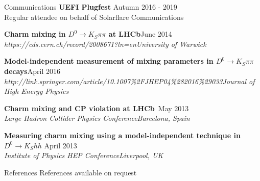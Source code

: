 \documentclass{format/resume} %
\begin{document}

\begin{rSection}{Communications}
  {\bf UEFI Plugfest} \hfill {Autumn 2016 - 2019} \\
  { Regular attendee on behalf of Solarflare Communications }

  {\bf Charm mixing in $D^{0}\rightarrow K_{S}\pi\pi$ at LHCb}\hfill{June 2014}\\
  {\it https://cds.cern.ch/record/2008671?ln=en}\hfill{\it University of Warwick}

  {\bf Model-independent measurement of mixing parameters in $D^{0}\rightarrow K_{S}\pi\pi$ decays}\hfill{April 2016}\\
  {\it http://link.springer.com/article/10.1007\%2FJHEP04\%282016\%29033}\hfill{\it Journal of High Energy Physics}


  {\bf Charm mixing and CP violation at LHCb}\hfill{\ May 2013}\\
  {\it Large Hadron Collider Physics Conference}\hfill{\it Barcelona, Spain}

  {\bf Measuring charm mixing using a model-independent technique in $D^{0} \rightarrow K_{S}hh$}\hfill{ April 2013}\\
  {\it Institute of Physics HEP Conference}\hfill{\it Liverpool, UK}
\end{rSection}


\begin{rSection}{References}
  References available on request
\end{rSection}

\end{document}

